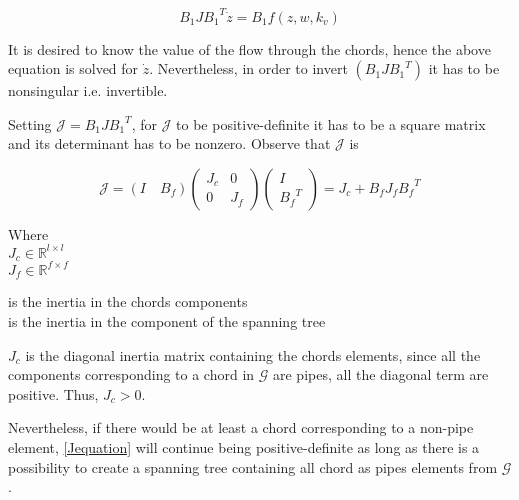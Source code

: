 \begin{equation}
  B_1 J {B_1}^T \dot{z}  = B_1 f(z, w, k_v)
 \end{equation}

It is desired to know the value of the flow through the chords, hence the above equation is solved 
for $\dot{z}$. Nevertheless, in order to invert $(B_1 J {B_1}^T)$ it has to be nonsingular i.e. invertible. 

Setting $\mathcal{J} = B_1 J {B_1}^T $, for $\mathcal{J}$ to be positive-definite it has to be a square matrix and its 
determinant has to be nonzero. Observe that $\mathcal{J}$ is

\begin{equation}
  \label{Jequation}
  \mathcal{J} = (I \quad B_f) 
  \begin{pmatrix}
    J_c    &    0    \\
    0       &    J_f
  \end{pmatrix}
  \begin{pmatrix}
    I    \\
    {B_f}^T
  \end{pmatrix}
  = J_c + B_f J_f {B_f}^T
\end{equation}

\begin{minipage}[t]{0.20\textwidth}
Where\\
\hspace*{8mm} $J_c \in \mathbb{R}^{l \times l}$  \\
\hspace*{8mm} $J_f \in \mathbb{R}^{f \times f} $ 
\end{minipage}
\begin{minipage}[t]{0.68\textwidth}
\vspace*{2mm}
\hspace*{4mm} is the inertia in the chords components\\
\hspace*{4mm} is the inertia in the component of the spanning tree 
\end{minipage}

$J_c$ is the diagonal inertia matrix containing the chords elements,  since all 
the components corresponding to a chord in $\mathcal{G}$ are pipes, all the 
diagonal term are positive. Thus, $J_c > 0$. 

Nevertheless, if there would be at least a chord corresponding to a non-pipe element, \eqref{Jequation} 
will continue being positive-definite as long as there is a possibility to create a spanning tree containing all 
chord as pipes elements from $\mathcal{G}$ \cite{TowerModel}.

